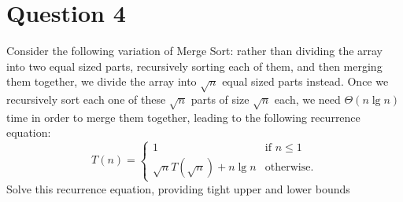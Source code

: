 \documentclass{article}
\begin{document}
\section*{Question 4}
Consider the following variation of Merge Sort: rather than dividing the array into
two equal sized parts, recursively sorting each of them, and then merging them together, we divide
the array into $\sqrt{n}$ equal sized parts instead. Once we recursively sort each one of these
$\sqrt{n}$ parts of size $\sqrt{n}$ each, we need $\Theta(n\lg n)$ time in order to merge them together,
leading to the following recurrence equation:
\begin{equation*}
T(n)=
\begin{cases}
1 &\text{if $n\leq 1$}\\
\sqrt{n}T(\sqrt{n})+n\lg n &\text{otherwise.}
\end{cases}
\end{equation*}
Solve this recurrence equation, providing tight upper and lower bounds
\end{document}
